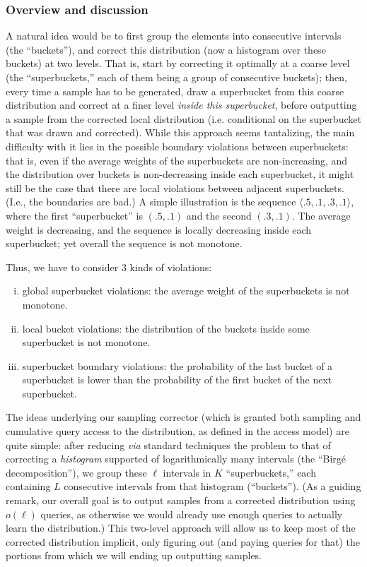 \subsubsection{Overview and discussion}

A natural idea would be to first group the elements into consecutive intervals (the ``buckets''), and correct this distribution (now a histogram over these buckets) at two levels. That is, start by correcting it optimally at a coarse level (the ``superbuckets,'' each of them being a group of consecutive buckets); then, every time a sample has to be generated, draw a superbucket from this coarse distribution and correct at a finer level \emph{inside this superbucket}, before outputting a sample from the corrected local distribution {(i.e. conditional on the superbucket that was drawn and corrected)}.
While this approach seems tantalizing, the main {difficulty} with it lies in the possible boundary violations between superbuckets: that is, even if the average weights of the superbuckets are non-increasing, and the distribution over buckets is non-decreasing inside each superbucket, it might still be the case that there are local violations between adjacent superbuckets. (I.e., the boundaries are bad.) A simple illustration is the sequence $\langle .5,.1,.3,.1 \rangle$, where the first ``superbucket'' is $(.5,.1)$ and the second $(.3,.1)$. The average weight is decreasing, and the sequence is locally decreasing inside each superbucket; yet overall the sequence is not monotone.\smallskip

\noindent Thus, we have to consider 3 kinds of violations:
\begin{enumerate}[(i)]
  \item\label{item:violation:1} global superbucket violations: the average weight of the superbuckets is not monotone.
  \item\label{item:violation:2} local bucket violations: the distribution of the buckets inside some superbucket is not monotone.
  \item\label{item:violation:3} {superbucket boundary violations}: the probability of the last bucket of a superbucket is lower than the probability of the first bucket of the next superbucket.
\end{enumerate}

The ideas underlying our sampling corrector (which is granted both sampling and cumulative query access to the distribution, as defined in the \Cdfsamp access model) are quite simple: after reducing \textit{via} standard techniques the problem to that of correcting a \emph{histogram} supported of logarithmically many intervals (the ``Birg\'e decomposition''), we group these $\ell$ intervals in $K$ ``superbuckets,'' each containing $L$ consecutive intervals from that histogram (``buckets''). (As a guiding remark, our overall goal is to output samples from a corrected distribution using $o(\ell)$ queries, as otherwise we would already use enough queries to actually learn the distribution.) This two-level approach will allow us to keep most of the corrected distribution implicit, only figuring out (and paying queries for that) the portions from which we will ending up outputting samples.

